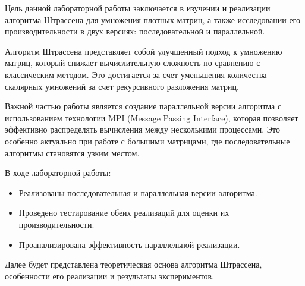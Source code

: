 Цель данной лабораторной работы заключается в изучении и реализации алгоритма Штрассена для умножения плотных матриц, а также исследовании его производительности в двух версиях: последовательной и параллельной. 

Алгоритм Штрассена представляет собой улучшенный подход к умножению матриц, который снижает вычислительную сложность по сравнению с классическим методом. Это достигается за счет уменьшения количества скалярных умножений за счет рекурсивного разложения матриц. 

Важной частью работы является создание параллельной версии алгоритма с использованием технологии MPI (Message Passing Interface), которая позволяет эффективно распределять вычисления между несколькими процессами. Это особенно актуально при работе с большими матрицами, где последовательные алгоритмы становятся узким местом.

В ходе лабораторной работы:
\begin{itemize}
    \item Реализованы последовательная и параллельная версии алгоритма.
    \item Проведено тестирование обеих реализаций для оценки их производительности.
    \item Проанализирована эффективность параллельной реализации.
\end{itemize}

Далее будет представлена теоретическая основа алгоритма Штрассена, особенности его реализации и результаты экспериментов.
